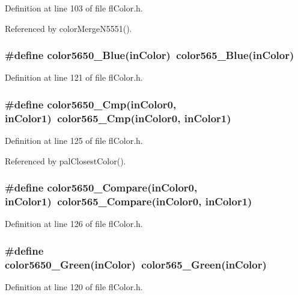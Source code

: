 Definition at line 103 of file fl\-Color.h.

Referenced by color\-Merge\-N5551().
\subsubsection{\setlength{\rightskip}{0pt plus 5cm}\#define color5650\_\-Blue(in\-Color)~color565\_\-Blue(in\-Color)}\label{flColor_8h_9e94ceee7d85700b2783382ca2576381}




Definition at line 121 of file fl\-Color.h.
\subsubsection{\setlength{\rightskip}{0pt plus 5cm}\#define color5650\_\-Cmp(in\-Color0, in\-Color1)~color565\_\-Cmp(in\-Color0, in\-Color1)}\label{flColor_8h_f8e9b6bc80612d38dc31f6db2489d84e}




Definition at line 125 of file fl\-Color.h.

Referenced by pal\-Closest\-Color().
\subsubsection{\setlength{\rightskip}{0pt plus 5cm}\#define color5650\_\-Compare(in\-Color0, in\-Color1)~color565\_\-Compare(in\-Color0, in\-Color1)}\label{flColor_8h_8d348fa57df4aaeab6667511f66180f2}




Definition at line 126 of file fl\-Color.h.
\subsubsection{\setlength{\rightskip}{0pt plus 5cm}\#define color5650\_\-Green(in\-Color)~color565\_\-Green(in\-Color)}\label{flColor_8h_5a36ce5f003a50db5de53cf9cedeb4a3}




Definition at line 120 of file fl\-Color.h.
